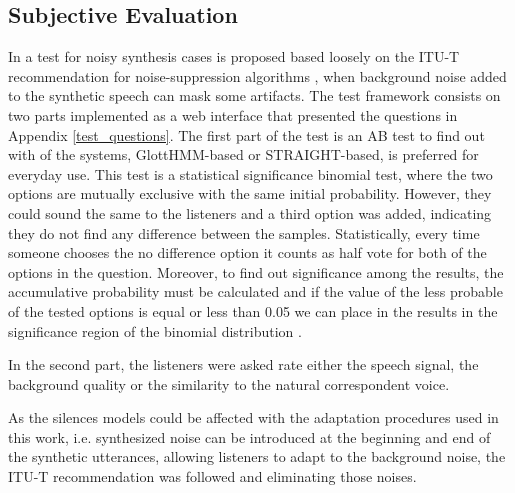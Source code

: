 \subsection{Subjective Evaluation}
\label{evaluation_subjective}
In \cite{karhila_remes_icassp13} a test for noisy synthesis cases is proposed based loosely on the ITU-T recommendation for noise-suppression algorithms \cite{itut835}, when background noise added to the synthetic speech can mask some artifacts.
%
The test framework consists on two parts implemented as a web interface that presented the questions in Appendix \ref{test_questions}.
%
The first part of the test is an AB test to find out with of the systems, GlottHMM-based or STRAIGHT-based, is preferred for everyday use.
%
This test is a statistical significance binomial test, where the two options are mutually exclusive with the same initial probability.
%
However, they could sound the same to the listeners and a third option was added, indicating they do not find any difference between the samples.
%
Statistically, every time someone chooses the no difference option it counts as half vote for both of the options in the question.
%
Moreover, to find out significance among the results, the accumulative probability must be calculated and if the value of the less probable of the tested options is equal or less than 0.05 we can place in the results in the significance region of the binomial distribution \cite{howell2012statistical}.

In the second part, the listeners were asked rate either the speech signal, the background quality or the similarity to the natural correspondent voice.

As the silences models could be affected with the adaptation procedures used in this work, i.e. synthesized noise can be introduced at the beginning and end of the synthetic utterances, allowing listeners to adapt to the background noise, the ITU-T recommendation \cite{itut835} was followed and eliminating those noises.